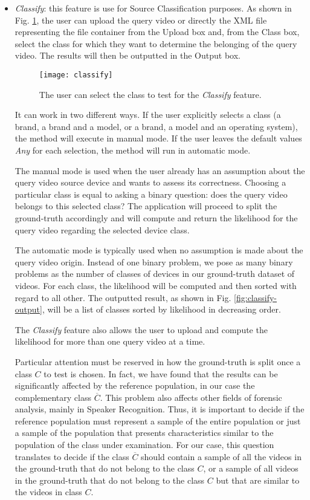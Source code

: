 \begin{itemize}

\item \emph{Classify}: this feature is use for Source Classification purposes. As shown in Fig. \ref{fig:classify}, the user can upload the query video or directly the XML file representing the file container from the Upload box and, from the Class box, select the class for which they want to determine the belonging of the query video. The results will then be outputted in the Output box. 

\begin{figure}
  \centering
  \texttt{[image: classify]}
  \caption{The user can select the class to test for the \emph{Classify} feature.}\label{fig:classify}
\end{figure}

It can work in two different ways. If the user explicitly selects a class (a brand, a brand and a model, or a brand, a model and an operating system), the method will execute in manual mode. If the user leaves the default values \emph{Any} for each selection, the method will run in automatic mode.

The manual mode is used when the user already has an assumption about the query video source device and wants to assess its correctness. Choosing a particular class is equal to asking a binary question: does the query video belongs to this selected class? The application will proceed to split the ground-truth accordingly and will compute and return the likelihood for the query video regarding the selected device class.

The automatic mode is typically used when no assumption is made about the query video origin. Instead of one binary problem, we pose as many binary problems as the number of classes of devices in our ground-truth dataset of videos. For each class, the likelihood will be computed and then sorted with regard to all other. The outputted result, as shown in Fig. \ref{fig:classify-output}, will be a list of classes sorted by likelihood in decreasing order.

The \emph{Classify} feature also allows the user to upload and compute the likelihood for more than one query video at a time.

Particular attention must be reserved in how the ground-truth is split once a class $C$ to test is chosen. In fact, we have found that the results can be significantly affected by the reference population, in our case the complementary class $\overline{C}$. This problem also affects other fields of forensic analysis, mainly in Speaker Recognition. Thus, it is important to decide if the reference population must represent a sample of the entire population or just a sample of the population that presents characteristics similar to the population of the class under examination. For our case, this question translates to decide if the class $\overline{C}$ should contain a sample of all the videos in the ground-truth that do not belong to the class $C$, or a sample of all videos in the ground-truth that do not belong to the class $C$ but that are similar to the videos in class $C$. 


\end{itemize}
